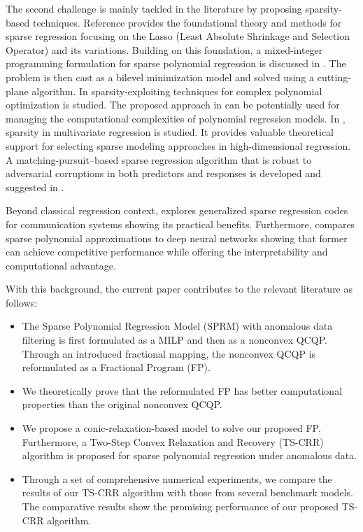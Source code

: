 \documentclass[smallextended,referee,envcountsect,,numbers]{svjour3}
\begin{document}
The second challenge is mainly tackled in the literature by proposing sparsity-based techniques.  Reference \cite{hastie2015statistical} provides the foundational theory and methods for sparse regression focusing on the Lasso (Least Absolute Shrinkage and Selection Operator) and its variations. Building on this foundation, a mixed-integer programming formulation for sparse polynomial regression is discussed in \cite{bertsimas2020sparse}. The problem is then cast as a bilevel minimization model and solved using a cutting-plane algorithm. In \cite{wang2022exploiting} sparsity-exploiting techniques for complex polynomial optimization is studied. The proposed approach in \cite{wang2022exploiting} can be potentially used for managing the computational complexities of polynomial regression models. In \cite{chen2023solution}, sparsity in multivariate regression is studied. It provides valuable theoretical support for selecting sparse modeling approaches in high-dimensional regression. A matching-pursuit–based sparse regression algorithm that is robust to adversarial corruptions in both predictors and responses is developed and suggested in \cite{chen2013robust}. 

Beyond classical regression context, \cite{sinha2024generalized} explores generalized sparse regression codes for communication systems showing its practical benefits. Furthermore, \cite{adcock2024learning} compares sparse polynomial approximations to deep neural networks showing that former can achieve competitive performance while offering the interpretability and computational advantage. 

With this background, the current paper contributes to the relevant literature as follows: 

\begin{itemize}
	\item The Sparse Polynomial Regression Model (SPRM) with anomalous data filtering is first formulated as a MILP and then as a nonconvex QCQP. Through an introduced fractional mapping, the nonconvex QCQP is reformulated as a Fractional Program (FP). 
	\item We theoretically prove that the reformulated FP has better computational properties than the original nonconvex QCQP. 
	\item We propose a conic-relaxation-based model to solve our proposed FP. Furthermore, a Two-Step Convex Relaxation and Recovery (TS-CRR) algorithm is proposed for sparse polynomial regression under anomalous data. 
	\item Through a set of comprehensive numerical experiments, we compare the results of our TS-CRR algorithm with those from several benchmark models. The comparative results show the promising performance of our proposed TS-CRR algorithm. 
\end{itemize}
\end{document}

